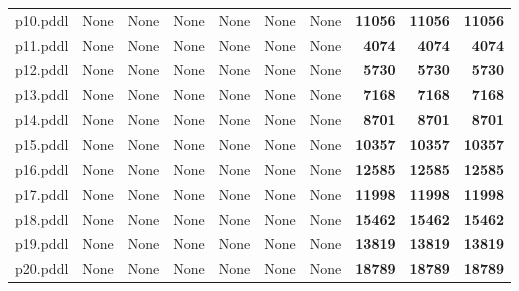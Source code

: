 \documentclass{article}
\begin{document}
\begin{tabular}{@{}lrrrrrrrrr@{}}
p10.pddl & \multicolumn{1}{|l|}{None} & \multicolumn{1}{|l|}{None} & \multicolumn{1}{|l|}{None} & \multicolumn{1}{|l|}{None} & \multicolumn{1}{|l|}{None} & \multicolumn{1}{|l|}{None} & \textbf{11056} & \textbf{11056} & \textbf{11056} \\
p11.pddl & \multicolumn{1}{|l|}{None} & \multicolumn{1}{|l|}{None} & \multicolumn{1}{|l|}{None} & \multicolumn{1}{|l|}{None} & \multicolumn{1}{|l|}{None} & \multicolumn{1}{|l|}{None} & \textbf{4074} & \textbf{4074} & \textbf{4074} \\
p12.pddl & \multicolumn{1}{|l|}{None} & \multicolumn{1}{|l|}{None} & \multicolumn{1}{|l|}{None} & \multicolumn{1}{|l|}{None} & \multicolumn{1}{|l|}{None} & \multicolumn{1}{|l|}{None} & \textbf{5730} & \textbf{5730} & \textbf{5730} \\
p13.pddl & \multicolumn{1}{|l|}{None} & \multicolumn{1}{|l|}{None} & \multicolumn{1}{|l|}{None} & \multicolumn{1}{|l|}{None} & \multicolumn{1}{|l|}{None} & \multicolumn{1}{|l|}{None} & \textbf{7168} & \textbf{7168} & \textbf{7168} \\
p14.pddl & \multicolumn{1}{|l|}{None} & \multicolumn{1}{|l|}{None} & \multicolumn{1}{|l|}{None} & \multicolumn{1}{|l|}{None} & \multicolumn{1}{|l|}{None} & \multicolumn{1}{|l|}{None} & \textbf{8701} & \textbf{8701} & \textbf{8701} \\
p15.pddl & \multicolumn{1}{|l|}{None} & \multicolumn{1}{|l|}{None} & \multicolumn{1}{|l|}{None} & \multicolumn{1}{|l|}{None} & \multicolumn{1}{|l|}{None} & \multicolumn{1}{|l|}{None} & \textbf{10357} & \textbf{10357} & \textbf{10357} \\
p16.pddl & \multicolumn{1}{|l|}{None} & \multicolumn{1}{|l|}{None} & \multicolumn{1}{|l|}{None} & \multicolumn{1}{|l|}{None} & \multicolumn{1}{|l|}{None} & \multicolumn{1}{|l|}{None} & \textbf{12585} & \textbf{12585} & \textbf{12585} \\
p17.pddl & \multicolumn{1}{|l|}{None} & \multicolumn{1}{|l|}{None} & \multicolumn{1}{|l|}{None} & \multicolumn{1}{|l|}{None} & \multicolumn{1}{|l|}{None} & \multicolumn{1}{|l|}{None} & \textbf{11998} & \textbf{11998} & \textbf{11998} \\
p18.pddl & \multicolumn{1}{|l|}{None} & \multicolumn{1}{|l|}{None} & \multicolumn{1}{|l|}{None} & \multicolumn{1}{|l|}{None} & \multicolumn{1}{|l|}{None} & \multicolumn{1}{|l|}{None} & \textbf{15462} & \textbf{15462} & \textbf{15462} \\
p19.pddl & \multicolumn{1}{|l|}{None} & \multicolumn{1}{|l|}{None} & \multicolumn{1}{|l|}{None} & \multicolumn{1}{|l|}{None} & \multicolumn{1}{|l|}{None} & \multicolumn{1}{|l|}{None} & \textbf{13819} & \textbf{13819} & \textbf{13819} \\
p20.pddl & \multicolumn{1}{|l|}{None} & \multicolumn{1}{|l|}{None} & \multicolumn{1}{|l|}{None} & \multicolumn{1}{|l|}{None} & \multicolumn{1}{|l|}{None} & \multicolumn{1}{|l|}{None} & \textbf{18789} & \textbf{18789} & \textbf{18789} \\
\end{tabular}
\end{document}
